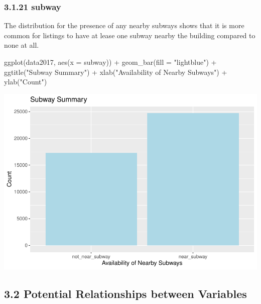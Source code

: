\documentclass[
]{article}
\newenvironment{Shaded}{\begin{snugshade}}{\end{snugshade}}
\newcommand{\AttributeTok}[1]{\textcolor[rgb]{0.77,0.63,0.00}{#1}}
\newcommand{\FunctionTok}[1]{\textcolor[rgb]{0.00,0.00,0.00}{#1}}
\newcommand{\NormalTok}[1]{#1}
\newcommand{\SpecialCharTok}[1]{\textcolor[rgb]{0.00,0.00,0.00}{#1}}
\newcommand{\StringTok}[1]{\textcolor[rgb]{0.31,0.60,0.02}{#1}}
\begin{document}
\hypertarget{subway}{%
\subsubsection{3.1.21 subway}\label{subway}}

The distribution for the presence of any nearby subways shows that it is
more common for listings to have at lease one subway nearby the building
compared to none at all.

\begin{Shaded}
\begin{Highlighting}[]
\FunctionTok{ggplot}\NormalTok{(data2017, }\FunctionTok{aes}\NormalTok{(}\AttributeTok{x =}\NormalTok{ subway)) }\SpecialCharTok{+}
  \FunctionTok{geom\_bar}\NormalTok{(}\AttributeTok{fill =} \StringTok{"lightblue"}\NormalTok{) }\SpecialCharTok{+}
  \FunctionTok{ggtitle}\NormalTok{(}\StringTok{"Subway Summary"}\NormalTok{) }\SpecialCharTok{+}
  \FunctionTok{xlab}\NormalTok{(}\StringTok{"Availability of Nearby Subways"}\NormalTok{) }\SpecialCharTok{+}
  \FunctionTok{ylab}\NormalTok{(}\StringTok{"Count"}\NormalTok{)}
\end{Highlighting}
\end{Shaded}

\includegraphics{Project_files/figure-latex/unnamed-chunk-38-1.pdf}

\hypertarget{potential-relationships-between-variables}{%
\subsection{3.2 Potential Relationships between
Variables}\label{potential-relationships-between-variables}}
\end{document}
